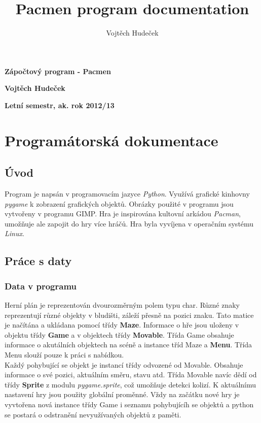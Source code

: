 \documentclass[10pt,a4paper]{article}
\author{Vojtěch Hudeček}
\title{Pacmen program documentation}
\begin{document}
\begin{center}

\begin{LARGE}
\textbf{Zápočtový program - Pacmen }

\textbf{Vojtěch Hudeček}

\textbf{Letní semestr, ak. rok 2012/13}
\linebreak 
\chapter{Programátorská dokumentace}
\end{LARGE}
\end{center}
\section{Úvod}
Program je napsán v programovacím jazyce \textit{Python}. Využívá grafické kinhovny \textit{pygame} k zobrazení grafických objektů. Obrázky použité v programu jsou vytvořeny v programu GIMP. Hra je inspirována kultovní arkádou \textit{Pacman}, umožňuje ale zapojit do hry více hráčů. Hra byla vyvíjena v operačním systému \textit{Linux}.
\section{Práce s daty}
\subsection{Data v programu}
Herní plán je reprezentován dvourozměrným polem typu char. Různé znaky reprezentují různé objekty v bludišti, záleží přesně na pozici znaku. Tato matice je načítána a ukládana pomocí třídy \textbf{Maze}. Informace o hře jsou uloženy v objektu třídy \textbf{Game} a v objektech třídy \textbf{Movable}. Třída Game obsahuje informace o akutálních objektech na scéně a instance tříd Maze a \textbf{Menu}. Třída Menu slouží pouze k práci s nabídkou.\\
Každý pohybující se objekt je instancí třídy odvozené od Movable. Obsahuje informace o své pozici, aktuálním směru, stavu atd. Třída Movable navíc dědí od třídy \textbf{Sprite} z modulu \textit{pygame.sprite}, což umožňuje detekci kolizí. K aktuálnímu nastavení hry jsou použity globální proměnné. Vždy na začátku nové hry je vyvtořena nová instance třídy Game i seznamu pohybujícíh se objektů a python se postará o odstranění nevyužívaných objektů z paměti.
\end{document}
